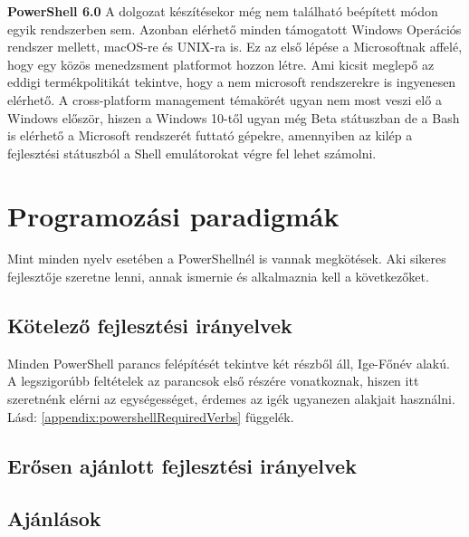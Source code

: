 \documentclass[12pt,oneside,justify,table]{book}
\renewcommand{\listfigurename}{Ábrajegyzék} %
\begin{document}
\noindent\textbf{PowerShell 6.0}
\newline A dolgozat készítésekor még nem található beépített módon egyik rendszerben sem. Azonban elérhető minden támogatott Windows Operációs rendszer mellett, macOS-re és UNIX-ra is. Ez az első lépése a Microsoftnak affelé, hogy egy közös menedzsment platformot hozzon létre. Ami kicsit meglepő az eddigi termékpolitikát tekintve, hogy a nem microsoft rendszerekre is ingyenesen elérhető.
A cross-platform management témakörét ugyan nem most veszi elő a Windows először, hiszen a Windows 10-től ugyan még Beta státuszban de a Bash is elérhető a Microsoft rendszerét futtató gépekre, amennyiben az kilép a fejlesztési státuszból a Shell emulátorokat végre fel lehet számolni.

\section{Programozási paradigmák}
Mint minden nyelv esetében a PowerShellnél is vannak megkötések. Aki sikeres fejlesztője szeretne lenni, annak ismernie és alkalmaznia kell a következőket.
\subsection{Kötelező fejlesztési irányelvek}
Minden PowerShell parancs felépítését tekintve két részből áll, Ige-Főnév alakú. A legszigorúbb feltételek az parancsok első részére vonatkoznak, hiszen itt szeretnénk elérni az egységességet, érdemes az igék ugyanezen alakjait használni. 
Lásd: \ref{appendix:powershellRequiredVerbs} függelék.
\subsection{Erősen ajánlott fejlesztési irányelvek}
\subsection{Ajánlások}

\cite{PowerShellGuidelines}

\addcontentsline{toc}{chapter}{\listfigurename}
\listoffigures
\printbibliography[heading=bibintoc,title={Irodalomjegyzék}]
\end{document}
